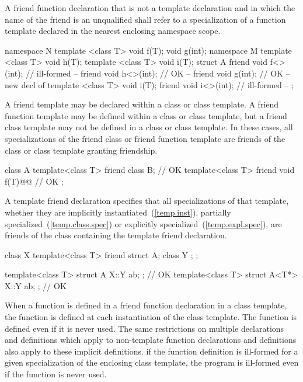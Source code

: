 \pnum
A friend function declaration that is not a template declaration and in
which the name of the friend is an unqualified 
shall refer to a specialization of a function template declared in the
nearest enclosing namespace scope.
\enterexample

\begin{codeblock}
namespace N {
	template <class T> void f(T);
	void g(int);
	namespace M {
		template <class T> void h(T);
		template <class T> void i(T);
		struct A {
			friend void f<>(int);	// ill-formed -- 
			friend void h<>(int);	// OK -- 
			friend void g(int);	// OK -- new decl of 
			template <class T> void i(T);
			friend void i<>(int);	// ill-formed -- 
		};
	}
}
\end{codeblock}

\exitexampleb

\pnum
A friend template may be declared within a class or class template.
A friend function template may be defined within a class or class
template, but a friend class template may not be defined in a class
or class template.
In these cases, all specializations of the friend class or friend function
template are friends of the class or class template granting friendship.
\enterexample

\begin{codeblock}
class A {
	template<class T> friend class B;       // OK
	template<class T> friend void f(T)@@	    // OK
};
\end{codeblock}
\exitexampleb

\pnum
A template friend declaration specifies that all specializations of that
template, whether they are implicitly instantiated~(\ref{temp.inst}), partially
specialized~(\ref{temp.class.spec}) or explicitly specialized~(\ref{temp.expl.spec}),
are friends of the class containing the template friend declaration.
\enterexample

\begin{codeblock}
class X {
	template<class T> friend struct A;
	class Y { };
};

template<class T> struct A { X::Y ab; };        // OK
template<class T> struct A<T*> { X::Y ab; };    // OK
\end{codeblock}
\exitexampleb

\pnum
When a function is defined in a friend function declaration in a class
template, the function is defined at each instantiation of the class
template. The function is defined even if it is never used. The
same restrictions on multiple declarations and definitions which apply
to non-template function declarations and definitions also apply to
these implicit definitions.
\enternote
if the function definition is ill-formed for a given specialization of
the enclosing class template, the program is ill-formed even if the
function is never used.
\exitnote

